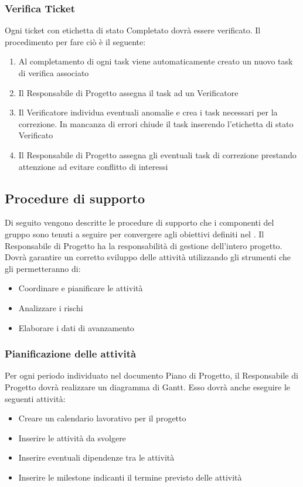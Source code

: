 \subsubsection{Verifica Ticket}

Ogni ticket con etichetta di stato Completato dovrà essere verificato. Il procedimento per fare ciò è il seguente:

\begin{enumerate}
	\item  Al completamento di ogni task viene automaticamente creato un nuovo task di verifica associato
	\item Il Responsabile di Progetto assegna il task ad un Verificatore
	\item Il Verificatore individua eventuali anomalie e crea i task necessari per la correzione. In mancanza di errori chiude il task inserendo l'etichetta di stato Verificato
	\item Il Responsabile di Progetto assegna gli eventuali task di correzione prestando attenzione ad evitare conflitto di interessi
\end{enumerate}

\subsection{Procedure di supporto}
Di seguito vengono descritte le procedure di supporto che i componenti del gruppo sono tenuti a seguire per convergere agli obiettivi definiti nel \pianodiqualifica. Il Responsabile di Progetto ha la responsabilità di gestione dell'intero progetto.
Dovrà garantire un corretto sviluppo delle attività utilizzando gli strumenti che gli permetteranno di:
\begin{itemize}
	\item Coordinare e pianificare le attività
	\item Analizzare i rischi
	\item Elaborare i dati di avanzamento
\end{itemize}

\subsubsection{Pianificazione delle attività}

Per ogni periodo individuato nel documento Piano di Progetto, il Responsabile di Progetto dovrà realizzare un diagramma di Gantt. Esso dovrà anche eseguire le seguenti attività:

\begin{itemize}
	\item Creare un calendario lavorativo per il progetto
	\item Inserire le attività da svolgere
	\item Inserire eventuali dipendenze tra le attività
	\item Inserire le milestone indicanti il termine previsto delle attività
\end{itemize}

